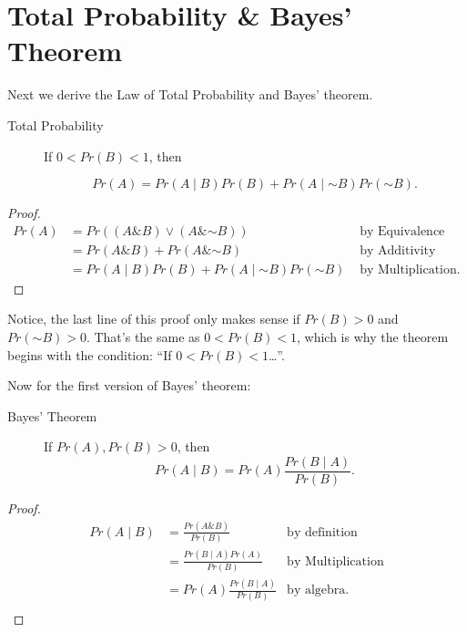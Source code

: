 \documentclass[justified]{tufte-book}
\newcommand{\given}{\mid}
\renewcommand{\neg}{\mathbin{\sim}}
\renewcommand{\wedge}{\mathbin{\&}}
\newcommand{\p}{Pr}
\theoremstyle{definition}
\theoremstyle{definition}
\theoremstyle{definition}
\theoremstyle{definition}
\theoremstyle{remark}
\begin{document}
\hypertarget{total-probability-bayes-theorem}{%
\section*{Total Probability \& Bayes' Theorem}\label{total-probability-bayes-theorem}}

Next we derive the Law of Total Probability and Bayes' theorem.

\begin{description}
\item[Total Probability]
If \(0 < \p(B) < 1\), then

\[ \p(A) = \p(A \given B)\p(B) + \p(A \given  \neg B)\p(\neg B). \]
\end{description}

\begin{proof}
{}
\[
  \begin{aligned}
    \p(A) &= \p((A \wedge B) \vee (A \wedge \neg B)) & \mbox{ by Equivalence}\\
          &= \p(A \wedge B) + \p(A \wedge \neg B) & \mbox{ by Additivity}\\
          &= \p(A \given B)\p(B) + \p(A \given \neg B)\p(\neg B) & \mbox{ by Multiplication.}
  \end{aligned}
\]
\end{proof}

Notice, the last line of this proof only makes sense if \(\p(B) > 0\) and \(\p(\neg B) > 0\). That's the same as \(0 < \p(B) < 1\), which is why the theorem begins with the condition: ``If \(0 < \p(B) < 1\)\ldots{}''.

Now for the first version of Bayes' theorem:

\begin{description}
\item[Bayes' Theorem]
If \(\p(A),\p(B)>0\), then
\[ \p(A \given B) = \p(A)\frac{\p(B \given A)}{\p(B)}. \]
\end{description}

\begin{proof}
{}
\[
  \begin{aligned}
    \p(A \given B) &= \frac{\p(A \wedge B)}{\p(B)} & \mbox{by definition}\\
              &= \frac{\p(B \given A)\p(A)}{\p(B)} & \mbox{by Multiplication}\\
              &= \p(A)\frac{\p(B \given A)}{\p(B)} & \mbox{by algebra.}\\
  \end{aligned}
\]
\end{proof}
\end{document}
